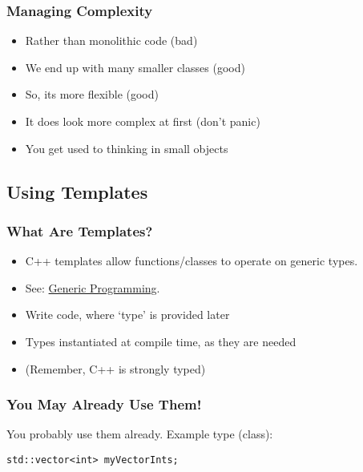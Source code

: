 \subsubsection{Managing Complexity}\label{managing-complexity}

\begin{itemize}
\itemsep1pt\parskip0pt
\item
  Rather than monolithic code (bad)
\item
  We end up with many smaller classes (good)
\item
  So, its more flexible (good)
\item
  It does look more complex at first (don't panic)
\item
  You get used to thinking in small objects
\end{itemize}

\subsection{Using Templates}\label{using-templates}

\subsubsection{What Are Templates?}\label{what-are-templates}

\begin{itemize}
\itemsep1pt\parskip0pt
\item
  C++ templates allow functions/classes to operate on generic types.
\item
  See: \href{http://en.wikipedia.org/wiki/Generic_programming}{Generic
  Programming}.
\item
  Write code, where `type' is provided later
\item
  Types instantiated at compile time, as they are needed
\item
  (Remember, C++ is strongly typed)
\end{itemize}

\subsubsection{You May Already Use
Them!}\label{you-may-already-use-them}

You probably use them already. Example type (class):

\begin{verbatim}
std::vector<int> myVectorInts;
\end{verbatim}

